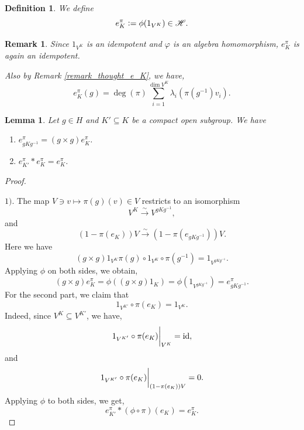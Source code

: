 \documentclass[8pt]{article}
\newtheorem{definition}{Definition}[section]
\newtheorem{lemma}{Lemma}[section]
\newtheorem{remark}{Remark}[section]
\DeclareMathOperator{\id}{id}
\newcommand{\defeq}{\vcentcolon=}
\newcommand{\hecke}[0]{\mathscr{H}}
\newcommand{\rest}[1]{\bigg{|}_{#1}}
\newcommand{\isomleft}{\stackrel{\sim}{\to}}
\begin{document}
\begin{definition}
  We define 
  \begin{equation*}
    e_K^\pi\defeq\phi(1_{V^K})\in\hecke.
  \end{equation*}
\end{definition}


\begin{remark}
  Since $1_{V^K}$ is an idempotent and $\varphi$ is an algebra homomorphism, $e_K^\pi$ is again an idempotent.
  \par Also by Remark \ref{remark_thought_e_K}, we have,
  \begin{equation*}
  e^\pi_K(g) = \deg(\pi)\sum_{i=1}^{\dim V^K}\lambda_i(\pi(g^{-1})v_i).
  \end{equation*}
\end{remark}

\begin{lemma}
  Let $g\in H$ and $K'\subseteq K$ be a compact open subgroup. We have 
  \begin{enumerate}[1).]
    \item $e^\pi_{gKg^{-1}} = (g\times g)e_K^\pi$.
    \item $e_{K'}^\pi\ast e_K^\pi = e_K^\pi$.
  \end{enumerate}
  \label{lemma_25}
\end{lemma}

\begin{proof}$\:$\\
  \par $1).$ The map $V\ni v\mapsto\pi(g)(v)\in V$ restricts to an isomorphism
  \begin{equation*}
    V^K\stackrel{\sim}{\to}V^{gKg^{-1}},
  \end{equation*}
  and 
  \begin{equation*}
    (1-\pi(e_K))V\isomleft (1-\pi(e_{gKg^{-1}}))V.
  \end{equation*}
  Here we have 
  \begin{equation*}
    (g\times g)1_{V^K}\pi(g)\circ 1_{V^K}\circ \pi(g^{-1}) = 1_{V^{gKg^{-1}}}.
  \end{equation*}
  Applying $\phi$ on both sides, we obtain,
  \begin{equation*}
    (g\times g)e_K^\pi = \phi((g\times g)1_K) = \phi(1_{V^{gKg^{-1}}}) = e^\pi_{g Kg^{-1}}.
  \end{equation*}
  For the second part, we claim that 
  \begin{equation*}
    1_{V^{K'}}\circ\pi(e_K) = 1_{V^K}.
  \end{equation*}
  Indeed, since $V^K\subseteq V^{K'}$, we have,
  \begin{equation*}
    1_{V^{K'}}\circ\pi(e_K)\rest{V^K} = \id,
  \end{equation*}
  and 
  \begin{equation*}
    1_{V^{K'}}\circ\pi(e_K)\rest{(1-\pi(e_K))V} = 0.
  \end{equation*}
  Applying $\phi$ to both sides, we get,
  \begin{equation*}
    e_{K'}^\pi\ast(\phi\circ\pi)(e_K) = e_K^\pi.
  \end{equation*}

\end{proof}
\end{document}
